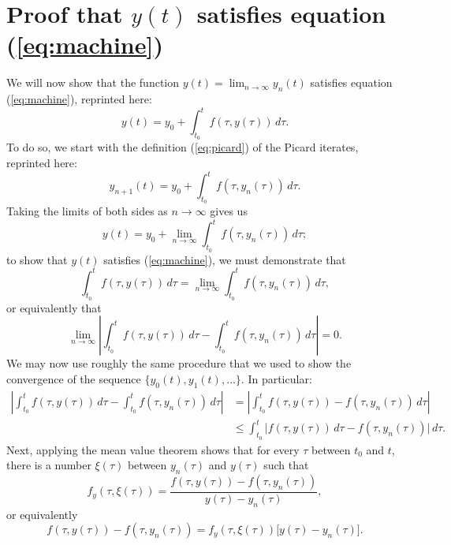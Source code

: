 \documentclass{myart}
\newcommand{\eq}[1]{(\ref{eq:#1})}
\begin{document}
\section{Proof that \texorpdfstring{$y(t)$}{y(t)} satisfies equation \eq{machine}}

We will now show that the function $y(t) = \lim_{n \to \infty} y_n(t)$ satisfies equation \eq{machine}, reprinted here:
\begin{equation*}
y(t) = y_0 + \int_{t_0}^t f(\tau, y(\tau)) \,d\tau.
\end{equation*}
To do so, we start with the definition \eq{picard} of the Picard iterates, reprinted here:
\begin{equation*}
y_{n+1}(t) = y_0 + \int_{t_0}^t f(\tau, y_n(\tau)) \,d\tau.
\end{equation*}
Taking the limits of both sides as $n \to \infty$ gives us
\begin{equation*}
y(t) = y_0 + \lim_{n \to \infty} \int_{t_0}^t f(\tau, y_n(\tau)) \,d\tau;
\end{equation*}
to show that $y(t)$ satisfies \eq{machine}, we must demonstrate that
\begin{equation*}
\int_{t_0}^t f(\tau, y(\tau)) \,d\tau = \lim_{n \to \infty} \int_{t_0}^t f(\tau, y_n(\tau)) \,d\tau,
\end{equation*}
or equivalently that
\begin{equation*}
\lim_{n \to \infty} \left|\int_{t_0}^t f(\tau, y(\tau)) \,d\tau - \int_{t_0}^t f(\tau, y_n(\tau)) \,d\tau\right| = 0.
\end{equation*}
We may now use roughly the same procedure that we used to show the convergence of the sequence $\{y_0(t), y_1(t), \ldots\}$. In particular:
\begin{align*}
\left|\int_{t_0}^t f(\tau, y(\tau)) \,d\tau - \int_{t_0}^t f(\tau, y_n(\tau)) \,d\tau\right| &= \left|\int_{t_0}^t f(\tau, y(\tau)) - f(\tau, y_n(\tau)) \,d\tau\right| \\
&\leq \int_{t_0}^t \Big|f(\tau, y(\tau)) \,d\tau - f(\tau, y_n(\tau))\Big| \,d\tau.
\end{align*}
Next, applying the mean value theorem shows that for every $\tau$ between $t_0$ and $t$, there is a number $\xi(\tau)$ between $y_n(\tau)$ and $y(\tau)$ such that
\begin{equation*}
f_y(\tau, \xi(\tau)) = \frac{f(\tau, y(\tau)) - f(\tau, y_n(\tau))}{y(\tau) - y_n(\tau)},
\end{equation*}
or equivalently
\begin{equation*}
f(\tau, y(\tau)) - f(\tau, y_n(\tau)) = f_y(\tau, \xi(\tau)) \Big[y(\tau) - y_n(\tau)\Big].
\end{equation*}
\end{document}
